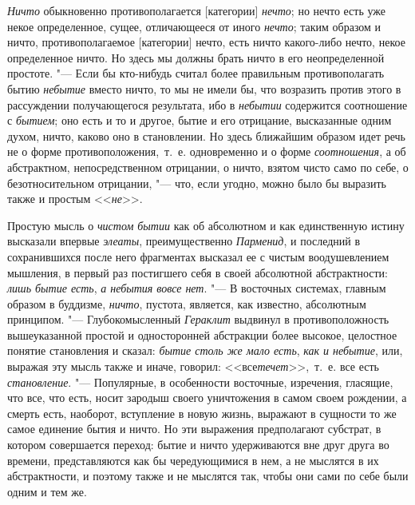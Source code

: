 {\em Ничто} обыкновенно противополагается [категории]
{\em нечто}; но нечто есть уже некое определенное,
сущее, отличающееся от иного {\em нечто}; таким
образом и ничто, противополагаемое [категории] нечто, есть ничто
какого-либо нечто, некое определенное ничто. Но здесь мы должны брать ничто
в его неопределенной простоте. "--- Если бы кто-нибудь считал более правильным
противополагать бытию {\em небытие} вместо ничто, то мы
не имели бы, что возразить против этого в рассуждении получающегося
результата, ибо в {\em небытии} содержится соотношение
с {\em бытием}; оно есть и то и другое, бытие и его
отрицание, высказанные одним духом, ничто, каково оно в становлении. Но
здесь ближайшим образом идет речь не о форме противоположения,~т.~е.
одновременно и о форме {\em соотношения}, а об
абстрактном, непосредственном отрицании, о ничто, взятом чисто само по
себе, о безотносительном отрицании, "--- что, если угодно, можно было бы
выразить также и простым <<{\em не}>>.

Простую мысль о {\em чистом бытии} как об абсолютном и
как единственную истину высказали впервые {\em элеаты},
преимущественно {\em Парменид}, и последний в
сохранившихся после него фрагментах высказал ее с чистым воодушевлением
мышления, в первый раз постигшего себя в своей абсолютной абстрактности:
{\em лишь бытие есть}, {\em а
небытия вовсе нет}. "--- В восточных системах, главным образом в буддизме,
{\em ничто}, пустота, является, как известно,
абсолютным принципом. "--- Глубокомысленный {\em Гераклит}
выдвинул в противоположность вышеуказанной простой и односторонней
абстракции более высокое, целостное понятие становления и сказал:
{\em бытие столь же мало есть},
{\em как и небытие}, или, выражая эту мысль также и
иначе, говорил: <<все{\em  течет}>>,~т.~е. все есть
{\em становление}. "--- Популярные, в особенности
восточные, изречения, гласящие, что все, что есть, носит зародыш своего
уничтожения в самом своем рождении, а смерть есть, наоборот, вступление в
новую жизнь, выражают в сущности то же самое единение бытия и ничто. Но эти
выражения предполагают субстрат, в котором совершается переход: бытие и
ничто удерживаются вне друг друга во времени, представляются как бы
чередующимися в нем, а не мыслятся в их абстрактности, и поэтому также и не
мыслятся так, чтобы они сами по себе были одним и тем же.

